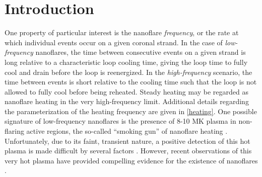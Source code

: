 \section{Introduction}\label{introduction}

One property of particular interest is the nanoflare \textit{frequency}, or the rate at which individual events occur on a given coronal strand. In the case of \textit{low-frequency} nanoflares, the time between consecutive events on a given strand is long relative to a characteristic loop cooling time, giving the loop time to fully cool and drain before the loop is reenergized. In the \textit{high-frequency} scenario, the time between events is short relative to the cooling time such that the loop is not allowed to fully cool before being reheated. Steady heating may be regarded as nanoflare heating in the very high-frequency limit. Additional details regarding the parameterization of the heating frequency are given in \autoref{heating}. One possible signature of low-frequency nanoflares is the presence of 8-10 MK plasma in non-flaring active regions, the so-called ``smoking gun'' of nanoflare heating \citep{cargill_implications_1994}. Unfortunately, due to its faint, transient nature, a positive detection of this hot plasma is made difficult by several factors \citep{winebarger_defining_2012,barnes_inference_2016}. However, recent observations of this very hot plasma have provided compelling evidence for the existence of nanoflares \citep[e.g.][]{reale_evidence_2009,schmelz_hinode_2009,testa_hinode/eis_2012,brosius_pervasive_2014,caspi_new_2015,parenti_spectroscopy_2017,ishikawa_detection_2017}.



